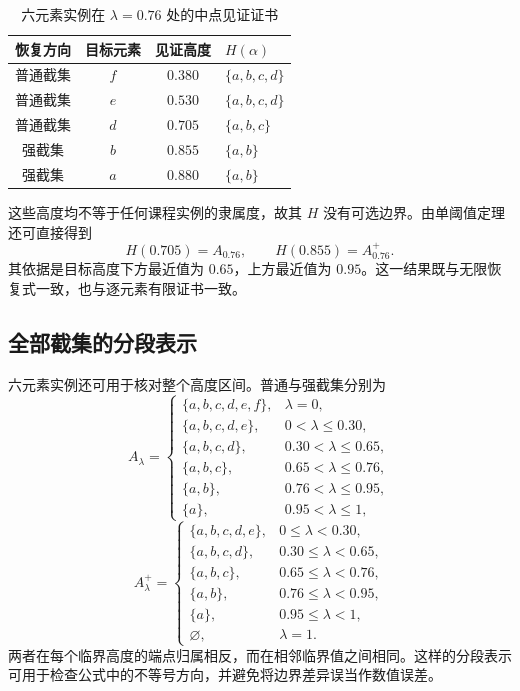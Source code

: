 \documentclass[UTF8,fontset=fandol,zihao=-4,a4paper]{ctexart}
\numberwithin{equation}{section}
\theoremstyle{reportplain}
\newcommand{\cut}[1]{A_{#1}}
\newcommand{\scut}[1]{A_{#1}^{+}}
\newcommand{\set}[1]{\{#1\}}
\newcommand{\eqtag}[1]{\label{#1}}
\begin{document}
\begin{table}[htbp]
\centering\small
\caption{六元素实例在 $\lambda=0.76$ 处的中点见证证书}
\label{tab:witness}
\begin{tabular}{cccl}
\toprule
恢复方向 & 目标元素 & 见证高度 & $H(\alpha)$\\
\midrule
普通截集 & $f$ & $0.380$ & $\set{a,b,c,d}$\\
普通截集 & $e$ & $0.530$ & $\set{a,b,c,d}$\\
普通截集 & $d$ & $0.705$ & $\set{a,b,c}$\\
\midrule
强截集 & $b$ & $0.855$ & $\set{a,b}$\\
强截集 & $a$ & $0.880$ & $\set{a,b}$\\
\bottomrule
\end{tabular}
\end{table}

这些高度均不等于任何课程实例的隶属度，故其 $H$ 没有可选边界。由单阈值定理还可直接得到
\begin{equation}
H(0.705)=\cut{0.76},\qquad H(0.855)=\scut{0.76}.
\eqtag{eq:course-single}
\end{equation}
其依据是目标高度下方最近值为 $0.65$，上方最近值为 $0.95$。这一结果既与无限恢复式一致，也与逐元素有限证书一致。

\subsection{全部截集的分段表示}
六元素实例还可用于核对整个高度区间。普通与强截集分别为
\begin{equation}
\cut{\lambda}=\begin{cases}
\set{a,b,c,d,e,f},&\lambda=0,\\
\set{a,b,c,d,e},&0<\lambda\le0.30,\\
\set{a,b,c,d},&0.30<\lambda\le0.65,\\
\set{a,b,c},&0.65<\lambda\le0.76,\\
\set{a,b},&0.76<\lambda\le0.95,\\
\set{a},&0.95<\lambda\le1,
\end{cases}
\eqtag{eq:piecewise-normal}
\end{equation}
\begin{equation}
\scut{\lambda}=\begin{cases}
\set{a,b,c,d,e},&0\le\lambda<0.30,\\
\set{a,b,c,d},&0.30\le\lambda<0.65,\\
\set{a,b,c},&0.65\le\lambda<0.76,\\
\set{a,b},&0.76\le\lambda<0.95,\\
\set{a},&0.95\le\lambda<1,\\
\varnothing,&\lambda=1.
\end{cases}
\eqtag{eq:piecewise-strong}
\end{equation}
两者在每个临界高度的端点归属相反，而在相邻临界值之间相同。这样的分段表示可用于检查公式中的不等号方向，并避免将边界差异误当作数值误差。
\end{document}
